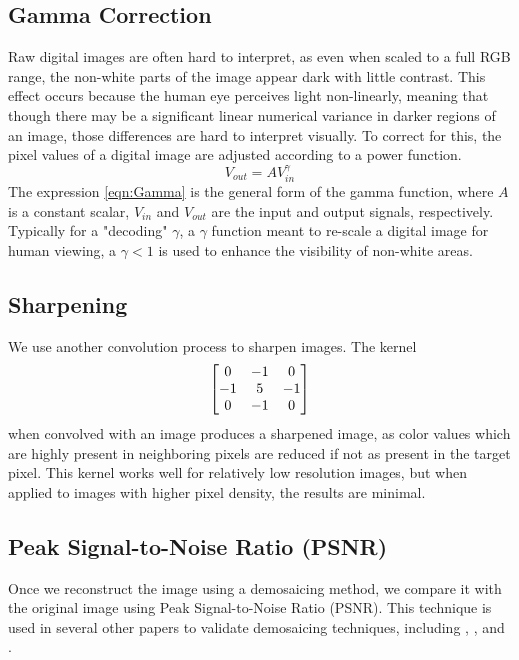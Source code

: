 \documentclass{article}\twocolumn
\begin{document}
\subsection{Gamma Correction}
    Raw digital images are often hard to interpret, as even when scaled to a full RGB range, the non-white parts of the image appear dark with little contrast. This effect occurs because the human eye perceives light non-linearly, meaning that though there may be a significant linear numerical variance in darker regions of an image, those differences are hard to interpret visually. To correct for this, the pixel values of a digital image are adjusted according to a power function. 
    \begin{equation}
        V_{out} = AV_{in}^{\gamma} \label{eqn:Gamma}
    \end{equation}
    The expression \eqref{eqn:Gamma} is the general form of the gamma function, where $A$ is a constant scalar, $V_{in}$ and $V_{out}$ are the input and output signals, respectively. 
    Typically for a "decoding" $\gamma$, a $\gamma$  function meant to re-scale a digital image for human viewing, a $\gamma < 1$ is used to enhance the visibility of non-white areas. 
\subsection{Sharpening}
    We use another convolution process to sharpen images. The kernel 
    \begin{align}
        \begin{bmatrix} 0 & -1 & 0 \\ -1 & 5 & -1 \\ 0 & -1 & 0 \end{bmatrix}
    \end{align}
    when convolved with an image produces a sharpened image, as color values which are highly present in neighboring pixels are reduced if not as present in the target pixel. This kernel works well for relatively low resolution images, but when applied to images with higher pixel density, the results are minimal. 

\subsection{Peak Signal-to-Noise Ratio (PSNR)}

Once we reconstruct the image using a demosaicing method, we compare it with the original image using Peak Signal-to-Noise Ratio (PSNR). This technique is used in several other papers to validate demosaicing techniques, including \cite{zapryanov_comparative_2008}, \cite{lukin_high-quality_2004}, and \cite{kimmel_demosaicing:_1999}.
\end{document}
